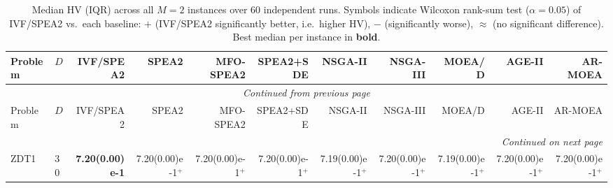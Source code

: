\documentclass[pdflatex,sn-mathphys-ay]{sn-jnl}%
\theoremstyle{thmstyleone}%
\theoremstyle{thmstyletwo}%
\theoremstyle{thmstylethree}%
\begin{document}
\clearpage
\begin{landscape}
	{\tiny
		\setlength{\tabcolsep}{2pt}%
		\renewcommand{\arraystretch}{0.95}%
		\begin{longtable}{llrrrrrrrrr}
			\caption{Median HV (IQR) across all $M=2$ instances over 60 independent runs. Symbols indicate Wilcoxon rank-sum test ($\alpha=0.05$) of IVF/SPEA2 vs.\ each baseline: $+$ (IVF/SPEA2 significantly better, i.e.\ higher HV), $-$ (significantly worse), $\approx$ (no significant difference). Best median per instance in \textbf{bold}.}
			\label{tab:hv_per_instance_m2}                                                                                                                                                                                                                                                                                                 \\
			\toprule
			Problem                           & $D$ & IVF/SPEA2              & SPEA2                              & MFO-SPEA2                    & SPEA2+SDE                 & NSGA-II                      & NSGA-III                           & MOEA/D                       & AGE-II                       & AR-MOEA                   \\
			\midrule
			\endfirsthead
			\multicolumn{11}{c}{{\textit{Continued from previous page}}}                                                                                                                                                                                                                                                                   \\
			\toprule
			Problem                           & $D$ & IVF/SPEA2              & SPEA2                              & MFO-SPEA2                    & SPEA2+SDE                 & NSGA-II                      & NSGA-III                           & MOEA/D                       & AGE-II                       & AR-MOEA                   \\
			\midrule
			\endhead
			\midrule
			\multicolumn{11}{r}{{\textit{Continued on next page}}}                                                                                                                                                                                                                                                                         \\
			\endfoot
			\botrule
			\endlastfoot
			ZDT1                              & 30  & \textbf{7.20(0.00)e-1} & 7.20(0.00)e-1$^{+}$                & 7.20(0.00)e-1$^{+}$          & 7.20(0.00)e-1$^{+}$       & 7.19(0.00)e-1$^{+}$          & 7.20(0.00)e-1$^{+}$                & 7.19(0.00)e-1$^{+}$          & 7.20(0.00)e-1$^{+}$          & 7.20(0.00)e-1$^{+}$       \\

\end{longtable}}
\end{landscape}
\end{document}
